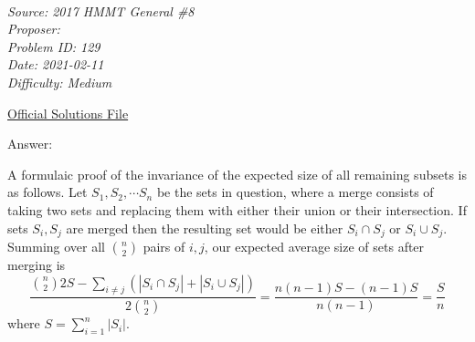 \SSbreak\\
\emph{Source: 2017 HMMT General \#8}\\
\emph{Proposer: \Paiya}\\
\emph{Problem ID: 129}\\
\emph{Date: 2021-02-11}\\
\emph{Difficulty: Medium}\\
\SSbreak

\bigskip

\begin{solution}
    
  \href{https://hmmt-archive.s3.amazonaws.com/tournaments/2017/nov/gen/solutions.pdf}{Official Solutions File} \medskip

  Answer:  \medskip

  A formulaic proof of the invariance of the expected size of all remaining subsets is as follows. Let $S_1, S_2, \cdots S_n$ be the sets in question, 
  where a merge consists of taking two sets and replacing them with either their union or their intersection. If sets $S_i, S_j$ are merged then the 
  resulting set would be either $S_i \cap S_j$ or $S_i \cup S_j$. Summing over all $\binom{n}{2}$ pairs of $i, j$, our expected average size of sets 
  after merging is 
  $$\dfrac{\binom{n}{2}2S - \sum_{i \neq j} \left(\left|S_i \cap S_j\right| + \left|S_i \cup S_j\right|\right)}{2\binom{n}{2}} = \dfrac{n(n - 1)S - (n - 1)S}{n(n - 1)} = \dfrac{S}{n}$$
  where $S = \sum_{i = 1}^n \left|S_i\right|$. 

\end{solution}\bigskip
